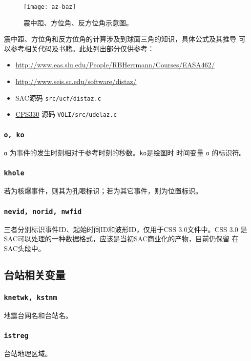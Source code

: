 \begin{figure}[H]
\centering
\texttt{[image: az-baz]}
\caption[震中距、方位角、反方位角示意图]{震中距、方位角、反方位角示意图。}
\label{fig:gcarc-dist-az-baz}
\end{figure}

震中距、方位角和反方位角的计算涉及到球面三角的知识，具体公式及其推导
可以参考相关代码及书籍。此处列出部分仅供参考：
\begin{itemize}
\item \url{http://www.eas.slu.edu/People/RBHerrmann/Courses/EASA462/}
\item \url{http://www.seis.sc.edu/software/distaz/}
\item SAC源码 \texttt{src/ucf/distaz.c}
\item \href{http://www.eas.slu.edu/eqc/eqccps.html}{CPS330} 源码 \texttt{VOLI/src/udelaz.c}
\end{itemize}

\subsubsection{\texttt{o, ko}}
\texttt{o} 为事件的发生时刻相对于参考时刻的秒数。\texttt{ko}是绘图时
时间变量 \texttt{o} 的标识符。

\subsubsection{\texttt{khole}}
若为核爆事件，则其为孔眼标识；若为其它事件，则为位置标识。

\subsubsection{\texttt{nevid, norid, nwfid}}
三者分别标识事件ID、起始时间ID和波形ID，仅用于CSS 3.0文件中。CSS 3.0
是SAC可以处理的一种数据格式，应该是当初SAC商业化的产物，目前仍保留
在SAC头段中。

\subsection{台站相关变量}
\subsubsection{\texttt{knetwk, kstnm}}
地震台网名和台站名。

\subsubsection{\texttt{istreg}\dag}
台站地理区域。

